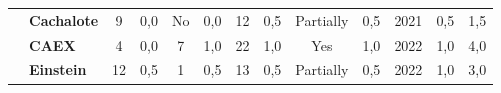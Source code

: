 \begin{table}
\begin{tabular}{c|p{2cm}|cc|cc|cc|cc|cc|c}
    \hhline{>{\arrayrulecolor[rgb]{0.753,0.753,0.753}}-->{\arrayrulecolor{black}}-----------}
    \rowcolor[rgb]{0.898,0.898,0.898} {\cellcolor[rgb]{0.753,0.753,0.753}}          & {\cellcolor[rgb]{0.753,0.753,0.753}}\textbf{Cachalote}                                             & 9                                                                         & 0,0                                                                       & No                                                                        & 0,0                                                                      & 12                                                       & 0,5                                               & Partially                                          & 0,5                                               & 2021                                               & 0,5                                                                                                                                                 & 1,5 \\
    {\cellcolor[rgb]{0.753,0.753,0.753}}                                            & {\cellcolor[rgb]{0.753,0.753,0.753}}\textbf{CAEX}                                                  & 4                                                                         & 0,0                                                                       & 7                                                                         & 1,0                                                                      & 22                                                       & 1,0                                               & Yes                                                & 1,0                                               & 2022                                               & 1,0                                                                                                                                                 & 4,0 \\
    \rowcolor[rgb]{0.898,0.898,0.898} {\cellcolor[rgb]{0.753,0.753,0.753}}          & {\cellcolor[rgb]{0.753,0.753,0.753}}\textbf{Einstein}                                              & 12                                                                        & 0,5                                                                       & 1                                                                         & 0,5                                                                      & 13                                                       & 0,5                                               & Partially                                          & 0,5                                               & 2022                                               & 1,0                                                                                                                                                 & 3,0 \\

\end{tabular}
\end{table}
